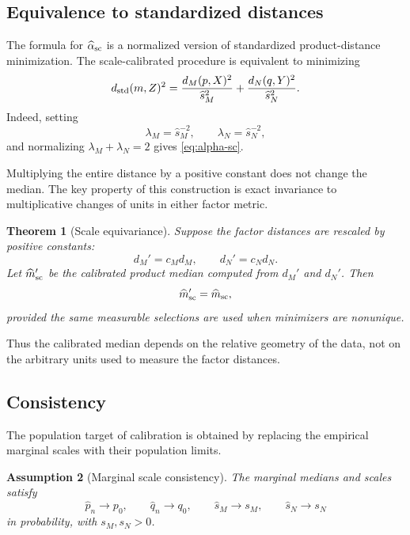 \documentclass[11pt]{article}
\newtheorem{theorem}{Theorem}
\newtheorem{assumption}[theorem]{Assumption}
\newcommand{\1}{\mathbf{1}}
\begin{document}
\subsection{Equivalence to standardized distances}

The formula for $\widehat\alpha_{\rm sc}$ is a normalized version of
standardized product-distance minimization.  The scale-calibrated procedure is
equivalent to minimizing
\begin{equation}\label{eq:standardized-distance}
 d_{\rm std}(m,Z)^2
 =\frac{d_M(p,X)^2}{\widehat s_M^2}
 +\frac{d_N(q,Y)^2}{\widehat s_N^2}.
\end{equation}
Indeed, setting
\[
 \lambda_M=\widehat s_M^{-2},
 \qquad
 \lambda_N=\widehat s_N^{-2},
\]
and normalizing $\lambda_M+\lambda_N=2$ gives \eqref{eq:alpha-sc}.  

Multiplying the entire distance by a positive constant does not change the
median. The key property of this construction is exact invariance to multiplicative
changes of units in either factor metric.
\begin{theorem}[Scale equivariance]\label{thm:scale-equivariance}
Suppose the factor distances are rescaled by positive constants:
\[
 d_M' = c_Md_M,
 \qquad
 d_N'=c_Nd_N.
\]
Let $\widehat m_{\rm sc}'$ be the calibrated product median computed from $d_M'$ and $d_N'$.  Then
\[
 \widehat m_{\rm sc}'=\widehat m_{\rm sc},
\]
provided the same measurable selections are used when minimizers are nonunique.
\end{theorem}
Thus the calibrated median depends on the relative geometry of the data, not on
the arbitrary units used to measure the factor distances.

\subsection{Consistency}

The population target of calibration is obtained by replacing the empirical
marginal scales with their population limits. 

\begin{assumption}[Marginal scale consistency]\label{ass:scale-consistency}
The marginal medians and scales satisfy
\[
 \widehat p_n\to p_0,
 \qquad
 \widehat q_n\to q_0,
 \qquad
 \widehat s_M\to s_M,
 \qquad
 \widehat s_N\to s_N
\]
in probability, with $s_M,s_N>0$.
\end{assumption}
\end{document}
